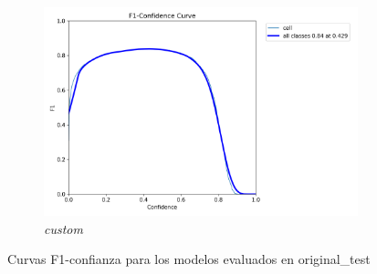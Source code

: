 \documentclass[12pt,a4paper,onecolumn,oneside]{report}
\begin{document}
\begin{figure}[H]
  \vspace{0.0cm}
  \begin{subfigure}[b]{0.48\textwidth}
    \centering
    \includegraphics[width=\textwidth]{figuras/resultados experimentacion/custom/original_test/BoxF1_curve.png}
    \caption{\textit{custom}}
    \label{fig:custom_original_test}
  \end{subfigure}
  
  \caption{Curvas F1-confianza para los modelos evaluados en original\_test}
  \label{fig:f1_curves_original_test}
\end{figure}
\end{document}
